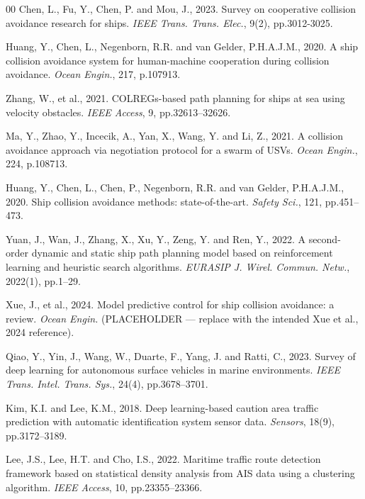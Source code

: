 \documentclass[final,5p,times,twocolumn]{elsarticle}
\begin{document}
\begin{thebibliography}{00}
Chen, L., Fu, Y., Chen, P. and Mou, J., 2023. Survey on cooperative collision avoidance research for ships. \textit{IEEE Trans. Trans. Elec.}, 9(2), pp.3012-3025.

Huang, Y., Chen, L., Negenborn, R.R. and van Gelder, P.H.A.J.M., 2020. A ship collision avoidance system for human-machine cooperation during collision avoidance. \textit{Ocean Engin.}, 217, p.107913.

Zhang, W., et al., 2021. COLREGs-based path planning for ships at sea using velocity obstacles. \textit{IEEE Access}, 9, pp.32613–32626.

Ma, Y., Zhao, Y., Incecik, A., Yan, X., Wang, Y. and Li, Z., 2021. A collision avoidance approach via negotiation protocol for a swarm of USVs. \textit{Ocean Engin.}, 224, p.108713.

Huang, Y., Chen, L., Chen, P., Negenborn, R.R. and van Gelder, P.H.A.J.M., 2020. Ship collision avoidance methods: state-of-the-art. \textit{Safety Sci.}, 121, pp.451–473.

Yuan, J., Wan, J., Zhang, X., Xu, Y., Zeng, Y. and Ren, Y., 2022. A second-order dynamic and static ship path planning model based on reinforcement learning and heuristic search algorithms. \textit{EURASIP J. Wirel. Commun. Netw.}, 2022(1), pp.1–29.

Xue, J., et al., 2024. Model predictive control for ship collision avoidance: a review. \textit{Ocean Engin.} (PLACEHOLDER --- replace with the intended Xue et al., 2024 reference).

Qiao, Y., Yin, J., Wang, W., Duarte, F., Yang, J. and Ratti, C., 2023. Survey of deep learning for autonomous surface vehicles in marine environments. \textit{IEEE Trans. Intel. Trans. Sys.}, 24(4), pp.3678–3701.

Kim, K.I. and Lee, K.M., 2018. Deep learning-based caution area traffic prediction with automatic identification system sensor data. \textit{Sensors}, 18(9), pp.3172–3189.

Lee, J.S., Lee, H.T. and Cho, I.S., 2022. Maritime traffic route detection framework based on statistical density analysis from AIS data using a clustering algorithm. \textit{IEEE Access}, 10, pp.23355–23366.


\end{thebibliography}
\end{document}
